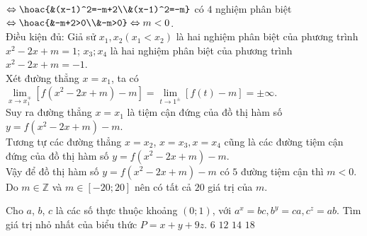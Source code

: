 \begin{ex}
{		$ \Leftrightarrow\hoac{&(x-1)^2=-m+2\\&(x-1)^2=-m} $ có $4$ nghiệm phân biệt $\Leftrightarrow\hoac{&-m+2>0\\&-m>0}\Leftrightarrow m<0$.\\
		Điều kiện đủ: Giả sử $x_1, x_2 (x_1<x_2)$ là hai nghiệm phân biệt của phương trình $x^2-2x+m=1$; $x_3; x_4$ là hai nghiệm phân biệt của phương trình $x^2-2x+m=-1$.\\
		Xét đường thẳng $x=x_1$, ta có $\lim\limits_{x\to x_1^{\mp}}\left[f\left(x^2-2x+m\right)-m\right]=\lim\limits_{t\to 1^{\pm}}[f(t)-m]=\pm\infty$.\\
		Suy ra đường thẳng $x=x_1$ là tiệm cận đứng của đồ thị hàm số $y=f\left(x^2-2x+m\right)-m$.\\
		Tương tự các đường thẳng $x=x_2$, $x=x_3, x=x_4$ cũng là các đường tiệm cận đứng của đồ thị hàm số $y=f\left(x^2-2x+m\right)-m$.\\
		Vậy để đồ thị hàm số $y=f\left(x^2-2x+m\right)-m$ có $5$ đường tiệm cận thì $m<0$.\\
		Do $m\in \mathbb{Z}$ và $m\in[-20; 20]$ nên có tất cả $20$ giá trị của $m$.}
\end{ex}
\begin{ex}%
	Cho $a$, $b$, $c$ là các số thực thuộc khoảng $(0; 1)$, với $a^x=bc, b^y=ca, c^z=ab$. Tìm giá trị nhỏ nhất của biểu thức $P=x+y+9z$. 
	\choice
	{$6$}
	{$12$}
	{\True $14$}
	{$18$}
\end{ex}
